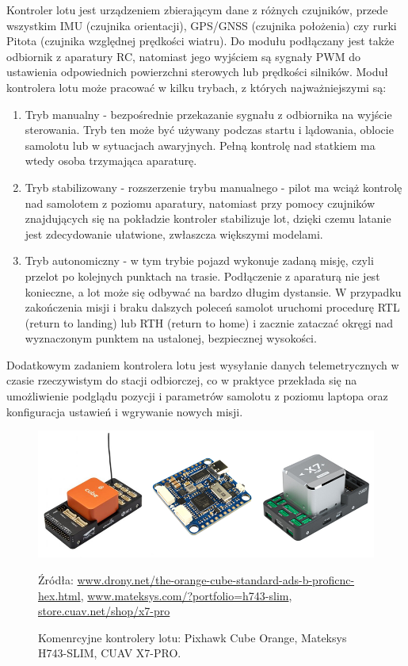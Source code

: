 \documentclass[12pt, a4paper]{article}
\begin{document}
Kontroler lotu jest urządzeniem zbierającym dane z różnych czujników, przede wszystkim IMU (czujnika orientacji), GPS/GNSS (czujnika położenia) czy rurki Pitota (czujnika względnej prędkości wiatru). Do modułu podłączany jest także odbiornik z aparatury RC, natomiast jego wyjściem są sygnały PWM do ustawienia odpowiednich powierzchni sterowych lub prędkości silników. 
Moduł kontrolera lotu może pracować w kilku trybach, z których najważniejszymi są:
\begin{enumerate}


	\item Tryb manualny - bezpośrednie przekazanie sygnału z odbiornika na wyjście sterowania. Tryb ten może być używany podczas startu i lądowania, oblocie samolotu lub w sytuacjach awaryjnych. Pełną kontrolę nad statkiem ma wtedy osoba trzymająca aparaturę.
	\item Tryb stabilizowany - rozszerzenie trybu manualnego - pilot ma wciąż kontrolę nad samolotem z poziomu aparatury, natomiast przy pomocy czujników znajdujących się na pokładzie kontroler stabilizuje lot, dzięki czemu latanie jest zdecydowanie ułatwione, zwłaszcza większymi modelami.
	\item Tryb autonomiczny - w tym trybie pojazd wykonuje zadaną misję, czyli przelot po kolejnych punktach na trasie. Podłączenie z aparaturą nie jest konieczne, a lot może się odbywać na bardzo długim dystansie. W przypadku zakończenia misji i braku dalszych poleceń samolot uruchomi procedurę RTL (return to landing) lub RTH (return to home) i zacznie zataczać okręgi nad wyznaczonym punktem na ustalonej, bezpiecznej wysokości.

\end{enumerate}
	
Dodatkowym zadaniem kontrolera lotu jest wysyłanie danych telemetrycznych w czasie rzeczywistym do stacji odbiorczej, co w praktyce przekłada się na umożliwienie podglądu pozycji i parametrów samolotu z poziomu laptopa oraz konfiguracja ustawień i wgrywanie nowych misji.

 \begin{figure}[ht]
    \centering
    \includegraphics[width=1\textwidth]{kontrolery}
    \caption{Komenrcyjne kontrolery lotu: Pixhawk Cube Orange, Mateksys H743-SLIM, CUAV X7-PRO.}
    \small Źródła: \url{www.drony.net/the-orange-cube-standard-ads-b-proficnc-hex.html}, \url{www.mateksys.com/?portfolio=h743-slim}, \url{store.cuav.net/shop/x7-pro}
    \label{fig:kontrolery}
\end{figure}
\end{document}
